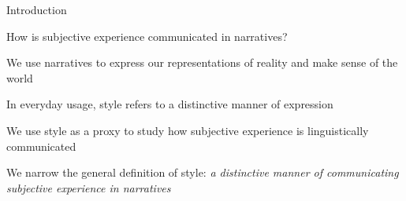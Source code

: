 \documentclass[handout,10pt]{beamer}
\begin{document}




    

\begin{frame}{Introduction}

How is subjective experience communicated in narratives?

\vspace{0.5cm}
\pause

We use narratives to express our representations of reality and make sense of the world \citep{brunerActsMeaning1990}

\vspace{0.5cm}
\pause

In everyday usage, style refers to a distinctive manner of expression

\vspace{0.5cm}
\pause

We use style as a proxy to study how subjective experience is linguistically communicated

\vspace{0.5cm}
\pause

We narrow the general definition of style: \textit{a distinctive manner of communicating subjective experience in narratives}

\end{frame}
\end{document}
